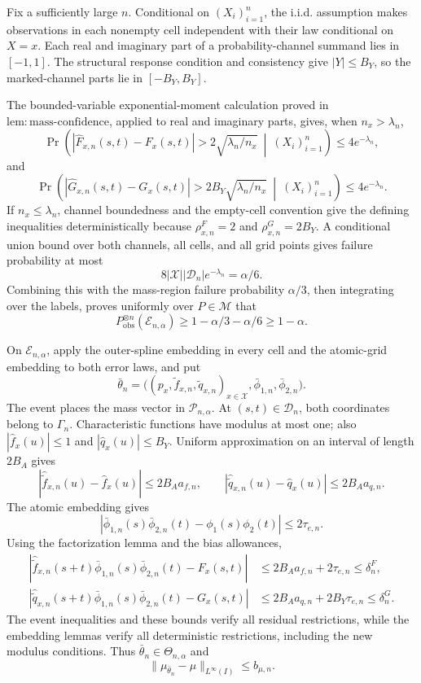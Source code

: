 Fix a sufficiently large \(n\). Conditional on \((X_i)_{i=1}^n\), the i.i.d. assumption makes observations in each nonempty cell independent with their law conditional on \(X=x\). Each real and imaginary part of a probability-channel summand lies in \([-1,1]\). The structural response condition and consistency give \(|Y|\le B_Y\), so the marked-channel parts lie in \([-B_Y,B_Y]\).

The bounded-variable exponential-moment calculation proved in \(\mathrm{lem{:}mass\text{-}confidence}\), applied to real and imaginary parts, gives, when \(n_x>\lambda_n\),
\[
 \Pr\left(
 |\widehat F_{x,n}(s,t)-F_x(s,t)|>2\sqrt{\lambda_n/n_x}
 \ \middle|\ (X_i)_{i=1}^n\right)\le4e^{-\lambda_n},
\]
and
\[
 \Pr\left(
 |\widehat G_{x,n}(s,t)-G_x(s,t)|>2B_Y\sqrt{\lambda_n/n_x}
 \ \middle|\ (X_i)_{i=1}^n\right)\le4e^{-\lambda_n}.
\]
If \(n_x\le\lambda_n\), channel boundedness and the empty-cell convention give the defining inequalities deterministically because \(\rho^F_{x,n}=2\) and \(\rho^G_{x,n}=2B_Y\). A conditional union bound over both channels, all cells, and all grid points gives failure probability at most
\[
 8|\mathcal X||\mathcal D_n|e^{-\lambda_n}=\alpha/6.
\]
Combining this with the mass-region failure probability \(\alpha/3\), then integrating over the labels, proves uniformly over \(P\in\mathcal M\) that
\[
 P_{\mathrm{obs}}^{\otimes n}(\mathcal E_{n,\alpha})
 \ge1-\alpha/3-\alpha/6\ge1-\alpha.
\]

On \(\mathcal E_{n,\alpha}\), apply the outer-spline embedding in every cell and the atomic-grid embedding to both error laws, and put
\[
 \bar\theta_n=
 \bigl((p_x,\widetilde f_{x,n},\widetilde q_{x,n})_{x\in\mathcal X},
       \bar\phi_{1,n},\bar\phi_{2,n}\bigr).
\]
The event places the mass vector in \(\mathcal P_{n,\alpha}\). At \((s,t)\in\mathcal D_n\), both coordinates belong to \(\Gamma_n\). Characteristic functions have modulus at most one; also \(|\widehat f_x(u)|\le1\) and \(|\widehat q_x(u)|\le B_Y\). Uniform approximation on an interval of length \(2B_A\) gives
\[
 |\widehat{\widetilde f}_{x,n}(u)-\widehat f_x(u)|\le2B_Aa_{f,n},
 \qquad
 |\widehat{\widetilde q}_{x,n}(u)-\widehat q_x(u)|\le2B_Aa_{q,n}.
\]
The atomic embedding gives
\[
 |\bar\phi_{1,n}(s)\bar\phi_{2,n}(t)-\phi_1(s)\phi_2(t)|
 \le2\tau_{e,n}.
\]
Using the factorization lemma and the bias allowances,
\[
 \begin{aligned}
 |\widehat{\widetilde f}_{x,n}(s+t)
   \bar\phi_{1,n}(s)\bar\phi_{2,n}(t)-F_x(s,t)|
 &\le2B_Aa_{f,n}+2\tau_{e,n}\le\delta^F_n,\\
 |\widehat{\widetilde q}_{x,n}(s+t)
   \bar\phi_{1,n}(s)\bar\phi_{2,n}(t)-G_x(s,t)|
 &\le2B_Aa_{q,n}+2B_Y\tau_{e,n}\le\delta^G_n.
 \end{aligned}
\]
The event inequalities and these bounds verify all residual restrictions, while the embedding lemmas verify all deterministic restrictions, including the new modulus conditions. Thus \(\bar\theta_n\in\Theta_{n,\alpha}\) and
\[
 \|\mu_{\bar\theta_n}-\mu\|_{L^\infty(I)}\le b_{\mu,n}.
\]

